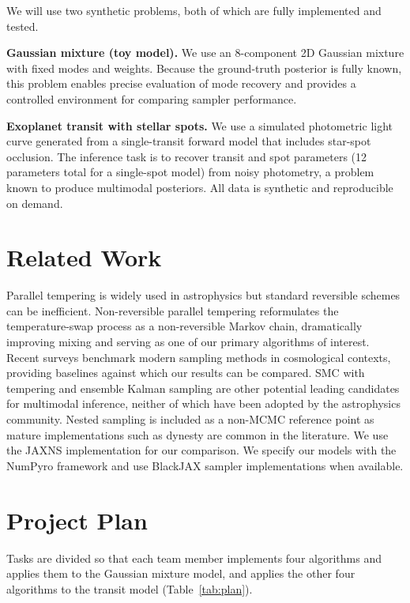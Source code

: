 \documentclass{article}
\begin{document}
We will use two synthetic problems, both of which are fully implemented and tested.

\textbf{Gaussian mixture (toy model).} We use an 8-component 2D Gaussian mixture with fixed modes and weights. Because the ground-truth posterior is fully known, this problem enables precise evaluation of mode recovery and provides a controlled environment for comparing sampler performance.

\textbf{Exoplanet transit with stellar spots.} We use a simulated photometric light curve generated from a single-transit forward model that includes star-spot occlusion. The inference task is to recover transit and spot parameters (12 parameters total for a single-spot model) from noisy photometry, a problem known to produce multimodal posteriors. All data is synthetic and reproducible on demand.

\section*{Related Work}

Parallel tempering is widely used in astrophysics \cite{vousden2016} but standard reversible schemes can be inefficient. Non-reversible parallel tempering \cite{syed2019} reformulates the temperature-swap process as a non-reversible Markov chain, dramatically improving mixing and serving as one of our primary algorithms of interest. Recent surveys \cite{staicova2025} benchmark modern sampling methods in cosmological contexts, providing baselines against which our results can be compared. SMC with tempering \cite{delmoral2006} and ensemble Kalman sampling \cite{garbuno2020} are other potential leading candidates for multimodal inference, neither of which have been adopted by the astrophysics community. Nested sampling is included as a non-MCMC reference point as mature implementations such as dynesty \cite{speagle2020} are common in the literature. We use the JAXNS implementation \cite{jaxns} for our comparison. We specify our models with the NumPyro \cite{numpyro} framework and use BlackJAX \cite{blackjax} sampler implementations when available. 

\section*{Project Plan}

Tasks are divided so that each team member implements four algorithms and applies them to the Gaussian mixture model, and applies the other four algorithms to the transit model (Table~\ref{tab:plan}).
\end{document}
